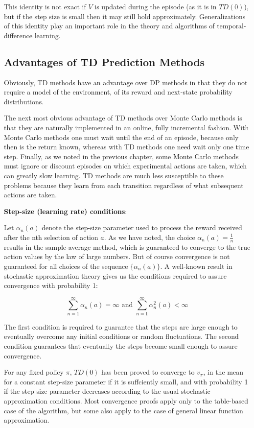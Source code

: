 \documentclass{article}
\begin{document}
This identity is not exact if $V$ is updated during the episode (as it is in $TD(0)$), but if the step size is small then it may still hold approximately. 
Generalizations of this identity play an important role in the theory and algorithms of temporal-difference learning.

\subsection{Advantages of TD Prediction Methods}

Obviously, TD methods have an advantage over DP methods in that they do not require a model of the environment, of its reward and next-state probability distributions.

The next most obvious advantage of TD methods over Monte Carlo methods is that they are naturally implemented in an online, fully incremental fashion. 
With Monte Carlo methods one must wait until the end of an episode, because only then is the return known, whereas with TD methods one need wait only one time step. 
Finally, as we noted in the previous chapter, some Monte Carlo methods must ignore or discount episodes 
on which experimental actions are taken, which can greatly slow learning. TD methods are much less susceptible to these problems because they learn from each transition 
regardless of what subsequent actions are taken.

\textbf{Step-size (learning rate) conditions}:

Let $\alpha_n(a)$ denote the step-size parameter used to process the reward received after the nth selection of action $a$. As we have noted, the choice $\alpha_n(a) = \frac{1}{n}$ 
results in the sample-average method, which is guaranteed to converge to the true action values by the law of large numbers. But of course convergence is not guaranteed for all choices 
of the sequence $\{\alpha_n(a)\}$. A well-known result in stochastic approximation theory gives us the conditions required to assure convergence with probability 1:

\[\sum_{n=1}^{\infty} \alpha_n(a) = \infty \text{ and } \sum_{n=1}^{\infty} \alpha_n^2(a) < \infty\]

The first condition is required to guarantee that the steps are large enough to eventually overcome any initial conditions or random fluctuations. The second condition guarantees 
that eventually the steps become small enough to assure convergence.

For any fixed policy $ \pi $, $TD(0)$ has been proved to converge to $v _ { \pi }$, in the mean for a constant step-size parameter if it is suffciently small, 
and with probability 1 if the step-size parameter decreases according to the usual stochastic approximation conditions. 
Most convergence proofs apply only to the table-based case of the algorithm, but some also apply to the case of general linear function approximation. 
\end{document}
